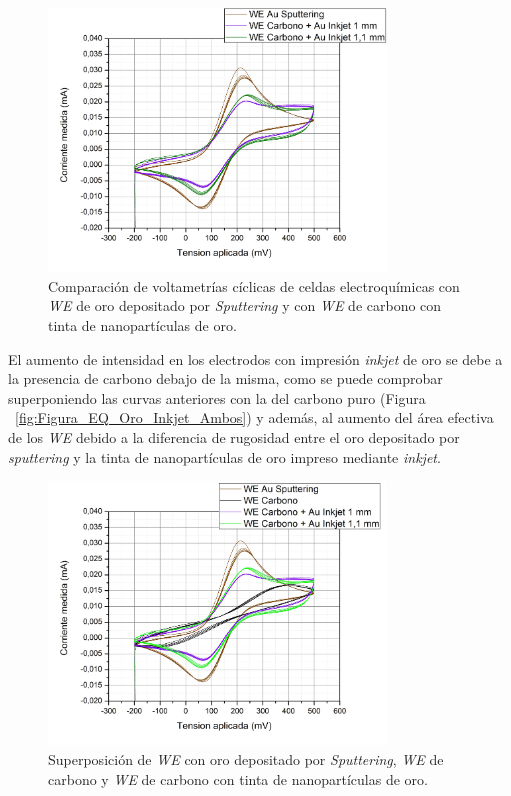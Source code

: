 \begin{figure}[H]
  \centering
    \includegraphics[width=0.8\textwidth]{Figuras/Figura_EQ_Sputt_2-Inkjet}
  \caption{Comparación de voltametrías cíclicas de celdas electroquímicas con \emph{WE} de oro depositado por \textit{Sputtering} y con \emph{WE} de carbono con tinta de nanopartículas de oro.}
  \label{fig:Figura_EQ_Sputt_2-Inkjet}
\end{figure}

El aumento de intensidad en los electrodos con impresión \textit{inkjet} de oro se debe a la presencia de carbono debajo de la misma, como se puede comprobar superponiendo las curvas anteriores con la del carbono puro (Figura ~\ref{fig:Figura_EQ_Oro_Inkjet_Ambos}) y además, al aumento del área efectiva de los \emph{WE} debido a la diferencia de rugosidad entre el oro depositado por \textit{sputtering} y la tinta de nanopartículas de oro impreso mediante \textit{inkjet}.

\begin{figure}[H]
  \centering
    \includegraphics[width=0.8\textwidth]{Figuras/Figura_EQ_Sptt_AuInkjet_Carbono_Valox}
  \caption{Superposición de \emph{WE} con oro depositado por \textit{Sputtering}, \emph{WE} de carbono y \emph{WE} de carbono con tinta de nanopartículas de oro.}
  \label{fig:Figura_EQ_Sptt_AuInkjet_Carbono_Valox}
\end{figure}

